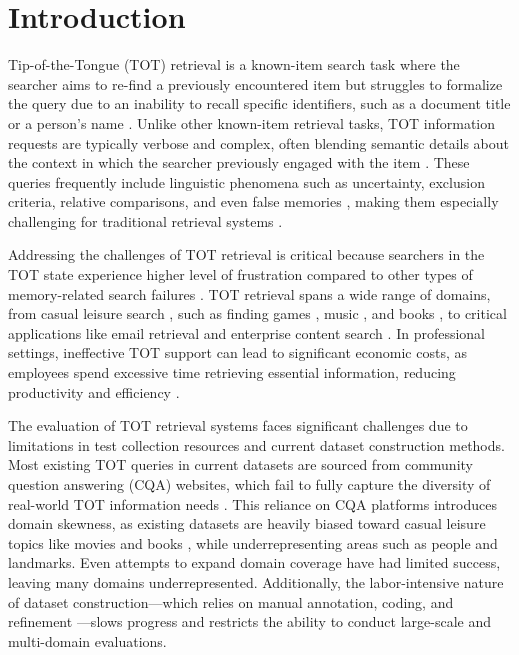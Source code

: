 \section{Introduction}
\label{sec:introduction}


Tip-of-the-Tongue (TOT) retrieval is a known-item search task where the searcher aims to re-find a previously encountered item but struggles to formalize the query due to an inability to recall specific identifiers, such as a document title or a person’s name \cite{arguello-movie-identification, Bhargav-2022-wsdm}. 
Unlike other known-item retrieval tasks, 
TOT information requests are typically verbose and complex, often blending semantic details about the context in which the searcher previously engaged with the item \cite{Meier21-complex-reddit, lee2006known}. 
These queries frequently include linguistic phenomena such as uncertainty, exclusion criteria, relative comparisons, and even false memories \cite{arguello-movie-identification, Meier21-complex-reddit}, making them especially challenging for traditional retrieval systems \cite{arguello-movie-identification, Bhargav-2022-wsdm, lin-etal-2023-whatsthatbook, arguello2023overview}.

Addressing the challenges of TOT retrieval is critical because searchers in the TOT state experience higher level of frustration compared to other types of memory-related search failures \cite{elsweiler2007towards}.
TOT retrieval spans a wide range of domains, from casual leisure search \cite{elsweiler2011casualleisure}, such as finding games \cite{gameTOT}, music \cite{Bhargav23MusicTOT}, and books \cite{Bhargav-2022-wsdm}, to critical applications like email retrieval \cite{Elsweiler08emailrefinding, Elsweiler2011Seeding, Kim09desktop} and enterprise content search \cite{Dumais03enterprise}. In professional settings, ineffective TOT support can lead to significant economic costs, as employees spend excessive time retrieving essential information, reducing productivity and efficiency \cite{white2015enterprisesearch}.


The evaluation of TOT retrieval systems faces significant challenges due to limitations in test collection resources and current dataset construction methods. Most existing TOT queries in current datasets are sourced from community question answering (CQA) websites, which fail to fully capture the diversity of real-world TOT information needs \cite{Meier21-complex-reddit}. This reliance on CQA platforms introduces domain skewness, as existing datasets are heavily biased toward casual leisure topics like movies and books \cite{elsweiler2011casualleisure}, while underrepresenting areas such as people and landmarks. Even attempts to expand domain coverage \cite{Meier21-complex-reddit} have had limited success, leaving many domains underrepresented.
Additionally, the labor-intensive nature of dataset construction---which relies on manual annotation, coding, and refinement \cite{Bhargav-2022-wsdm, Bhargav23MusicTOT, arguello-movie-identification, Meier21-complex-reddit}---slows progress and restricts the ability to conduct large-scale and multi-domain evaluations. 


